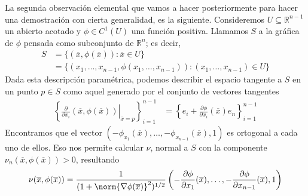\documentclass{report}
\newcommand{\realNumbers}{\mathbb{R}}
\theoremstyle{definition}
\theoremstyle{remark}
\begin{document}
  \newpage
  La segunda observación elemental que vamos a hacer posteriormente para hacer una demostración con cierta generalidad, es la siguiente.
  Consideremos \(U \subseteq \realNumbers^{n - 1}\) un abierto acotado y \(\phi \in C^1(U)\) una función positiva.
  Llamamos \(S\) a la gráfica de \(\phi\) pensada como subconjunto de \(\realNumbers^n\);
  es decir,
  \begin{align}
    S
    &=
    \{(\overline{x}, \phi(\overline{x})) : \overline{x} \in U\}
    \\
    &=
    \{(x_1, \dots, x_{n - 1}, \phi(x_1, \dots, x_{n - 1})) : (x_1, \dots, x_{n - 1}) \in U\}
  \end{align}
  Dada esta descripción paramétrica, podemos describir el espacio tangente a \(S\) en un punto \(p \in S\) como aquel generado por el conjunto de vectores tangentes
  \begin{align}
    \left\{
      \left.
        \frac{\partial}{\partial x_i}
        (\overline{x}, \phi(\overline{x}))
      \right\vert_{\overline{x} = p}
    \right\}_{i = 1}^{n - 1}
    &=
    \left\{
      e_i
      +
      \frac{\partial \phi}{\partial x_i}(\overline{x}) e_n
    \right\}_{i = 1}^{n - 1}
  \end{align}
  Encontramos que el vector \((- \phi_{x_1}(\overline{x}), \dots, - \phi_{x_{n - 1}}(\overline{x}), 1)\) es ortogonal a cada uno de ellos.
  Eso nos permite calcular \(\nu\), normal a \(S\) con la componente \(\nu_n(\overline{x}, \phi(\overline{x})) > 0\), resultando
  \begin{align}
    \nu(\overline{x}, \phi(\overline{x}))
    =
    \frac{1}{(1 + \norm{\nabla \phi (\overline{x})}^2)^{1/2}}
    \left(
      - \frac{\partial \phi}{\partial x_1}(\overline{x}), \dots, - \frac{\partial \phi}{\partial x_{n - 1}}(\overline{x}),
      1
    \right)
  \end{align}
  
\end{document}
